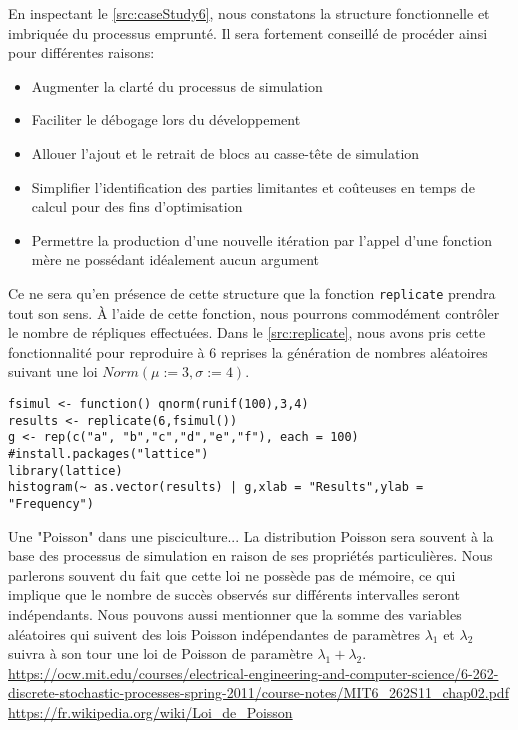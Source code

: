 En inspectant le \autoref{src:caseStudy6}, nous constatons la structure fonctionnelle et imbriquée du processus emprunté. Il sera fortement conseillé de procéder ainsi pour différentes raisons:

\begin{itemize}
	\item Augmenter la clarté du processus de simulation
	\item Faciliter le débogage lors du développement
	\item Allouer l'ajout et le retrait de blocs au casse-tête de simulation
	\item Simplifier l'identification des parties limitantes et coûteuses en temps de calcul pour des fins d'optimisation
	\item Permettre la production d'une nouvelle itération par l'appel d'une fonction mère ne possédant idéalement aucun argument
\end{itemize}

Ce ne sera qu'en présence de cette structure que la fonction \texttt{replicate} prendra tout son sens. À l'aide de cette fonction, nous pourrons commodément contrôler le nombre de répliques effectuées. Dans le \autoref{src:replicate}, nous avons pris cette fonctionnalité pour reproduire à 6 reprises la génération de nombres aléatoires suivant une loi $Norm(\mu := 3, \sigma := 4)$.

\begin{lstlisting}[caption = Réplication d'une analyse par simulation,label=src:replicate]
fsimul <- function() qnorm(runif(100),3,4)
results <- replicate(6,fsimul())
g <- rep(c("a", "b","c","d","e","f"), each = 100)
#install.packages("lattice")
library(lattice)
histogram(~ as.vector(results) | g,xlab = "Results",ylab = "Frequency") 
\end{lstlisting}


\begin{moreInfo}{Une "Poisson" dans une pisciculture...}
	La distribution Poisson sera souvent à la base des processus de simulation en raison de ses propriétés particulières. Nous parlerons souvent du fait que cette loi ne possède pas de mémoire, ce qui implique que le nombre de succès observés sur différents intervalles seront indépendants. Nous pouvons aussi mentionner que la somme des variables aléatoires qui suivent des lois Poisson indépendantes de paramètres $\lambda_1$ et $\lambda_2$ suivra à son tour une loi de Poisson de paramètre $\lambda_1 + \lambda_2$. \\
	\url{https://ocw.mit.edu/courses/electrical-engineering-and-computer-science/6-262-discrete-stochastic-processes-spring-2011/course-notes/MIT6_262S11_chap02.pdf} \\
	\url{https://fr.wikipedia.org/wiki/Loi_de_Poisson}
\end{moreInfo}

